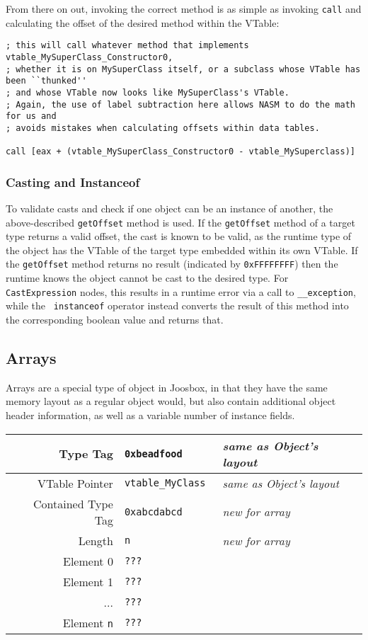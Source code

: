 \documentclass[letterpaper]{article}
\begin{document}
  From there on out, invoking the correct method is as simple as invoking {\tt call} and
  calculating the offset of the desired method within the VTable:

  \begin{verbatim}
; this will call whatever method that implements vtable_MySuperClass_Constructor0,
; whether it is on MySuperClass itself, or a subclass whose VTable has been ``thunked''
; and whose VTable now looks like MySuperClass's VTable.
; Again, the use of label subtraction here allows NASM to do the math for us and
; avoids mistakes when calculating offsets within data tables.

call [eax + (vtable_MySuperClass_Constructor0 - vtable_MySuperclass)]
  \end{verbatim}

  \subsubsection{Casting and Instanceof}

  To validate casts and check if one object can be an instance of another, the
  above-described {\tt getOffset} method is used. If the {\tt getOffset}
  method of a target type returns a valid offset, the cast is known to be
  valid, as the runtime type of the object has the VTable of the target type
  embedded within its own VTable. If the {\tt getOffset} method returns no
  result (indicated by {\tt 0xFFFFFFFF}) then the runtime knows the object
  cannot be cast to the desired type. For {\tt CastExpression} nodes, this
  results in a runtime error via a call to {\tt \_\_exception}, while the {\tt
  instanceof} operator instead converts the result of this method into the
  corresponding boolean value and returns that.

  \subsection{Arrays}

  Arrays are a special type of object in Joosbox, in that they have the same
  memory layout as a regular object would, but also contain additional object
  header information, as well as a variable number of instance fields.

  \begin{center}
  \begin{tabular}{| r | l | l | }
    \hline
    Type Tag & {\tt 0xbeadfood } & {\em same as Object's layout} \\ \hline
    VTable Pointer & {\tt vtable\_MyClass } & {\em same as Object's layout} \\ \hline
    Contained Type Tag & {\tt 0xabcdabcd } & {\em new for array} \\ \hline
    Length & {\tt n } & {\em new for array} \\ \hline
    Element 0 & {\tt ??? } \\ 
    Element 1 & {\tt ??? } \\ 
    ... & {\tt ??? } \\ 
    Element {\tt n} & {\tt ??? } \\ \hline
  \end{tabular}
\end{center}
\end{document}
